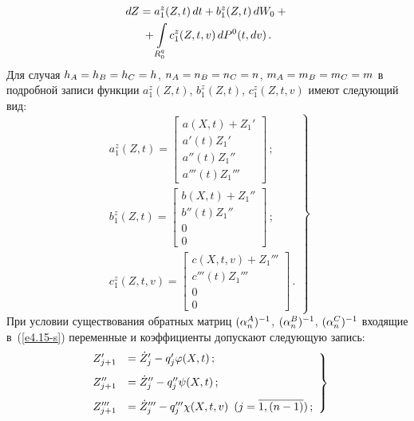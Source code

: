 \begin{multicols}{2}
\noindent
    \begin{multline}
    dZ = a_1^z (Z, t)\, dt + b_1^z (Z, t)\, dW_0+{}\\
    {}+
    \int\limits_{R_0^q} c_1^z (Z,  t, v) \,d P^0 (t, dv)\,.
    \label{e4.14-s}
    \end{multline}
Для случая  $h_A \hm= h_B \hm= h_C=h$, $n_A\hm= n_B\hm=n_C\hm=n$,
$m_A\hm=m_B\hm=m_C\hm=m$ в подробной записи функции $a^z_1 (Z,t)$,
$b^z_1 (Z,t)$, $c^z_1 (Z, t,v)$ имеют следующий вид:
\begin{equation}
\left.
\begin{array}{c}
a_1^z (Z, t)=\begin{bmatrix}
        a(X, t)+ Z_1'\\
        a'(t)Z_1'\\
        a''(t) Z_1''\\
        a'''(t)Z_1'''\end{bmatrix}\,;\\[20pt]
    b_1^z (Z, t)=\begin{bmatrix}
        b(X, t)+ Z_1''\\
        b''(t)Z_1''\\
        0\\
        0\end{bmatrix}\,;\\[20pt]
c_1^z (Z, t,v)=\begin{bmatrix}
        c(X, t,v)+ Z_1'''\\
        c'''(t)Z_1'''\\
        0\\
        0\end{bmatrix}\,.
        \end{array}
        \right\}
        \label{e4.15-s}
        \end{equation}
При условии существования обратных матриц $(\alpha_n^A)^{-1}$,
 $(\alpha_n^B)^{-1}$, $(\alpha_n^C)^{-1}$ входящие в~(\ref{e4.15-s})
 переменные и коэффициенты допускают  следующую запись:
\begin{equation}
\left.
\begin{array}{rl}
Z_{j+1}' &=\dot Z_j' - q_j' \varphi(X,t)\,;\\[9pt]
    Z_{j+1}'' &=\dot Z_j'' - q_j'' \psi(X,t)\,;\\[9pt]
 Z_{j+1}''' &=\dot Z_j'''- q_j''' \chi(X,t,v)\enskip (j=\overline{1,(n-1)})\,;
\end{array}
\right\}
 \label{e4.16-s}
 \end{equation}

 \vspace*{-13pt}


\end{multicols}
